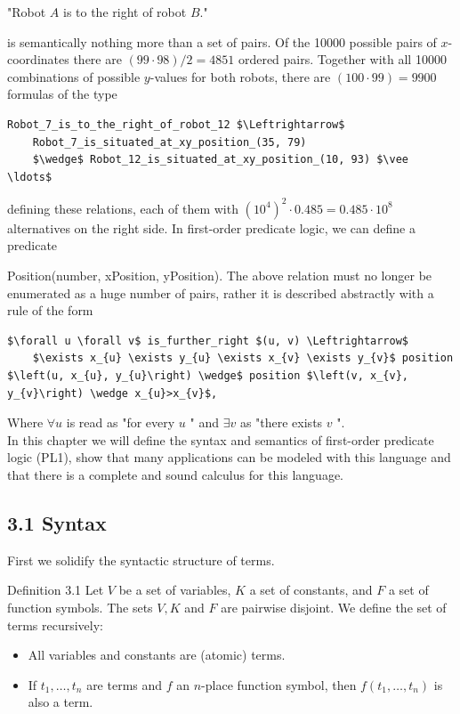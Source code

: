 \documentclass[10pt]{book}
\begin{document}
\begin{displayquote}
"Robot $A$ is to the right of robot $B$."
\end{displayquote}

is semantically nothing more than a set of pairs. Of the 10000 possible pairs of $x$-coordinates there are $(99 \cdot 98) / 2=4851$ ordered pairs. Together with all 10000 combinations of possible $y$-values for both robots, there are $(100 \cdot 99)=9900$ formulas of the type

\begin{verbatim}
Robot_7_is_to_the_right_of_robot_12 $\Leftrightarrow$
    Robot_7_is_situated_at_xy_position_(35, 79)
    $\wedge$ Robot_12_is_situated_at_xy_position_(10, 93) $\vee \ldots$
\end{verbatim}

defining these relations, each of them with $\left(10^{4}\right)^{2} \cdot 0.485=0.485 \cdot 10^{8}$ alternatives on the right side. In first-order predicate logic, we can define a predicate

Position(number, xPosition, yPosition). The above relation must no longer be enumerated as a huge number of pairs, rather it is described abstractly with a rule of the form

\begin{verbatim}
$\forall u \forall v$ is_further_right $(u, v) \Leftrightarrow$
    $\exists x_{u} \exists y_{u} \exists x_{v} \exists y_{v}$ position $\left(u, x_{u}, y_{u}\right) \wedge$ position $\left(v, x_{v}, y_{v}\right) \wedge x_{u}>x_{v}$,
\end{verbatim}

Where $\forall u$ is read as "for every $u$ " and $\exists v$ as "there exists $v$ ".\\
In this chapter we will define the syntax and semantics of first-order predicate logic (PL1), show that many applications can be modeled with this language and that there is a complete and sound calculus for this language.

\subsection*{3.1 Syntax}
First we solidify the syntactic structure of terms.

Definition 3.1 Let $V$ be a set of variables, $K$ a set of constants, and $F$ a set of function symbols. The sets $V, K$ and $F$ are pairwise disjoint. We define the set of terms recursively:

\begin{itemize}
  \item All variables and constants are (atomic) terms.
  \item If $t_{1}, \ldots, t_{n}$ are terms and $f$ an $n$-place function symbol, then $f\left(t_{1}, \ldots, t_{n}\right)$ is also a term.
\end{itemize}
\end{document}
